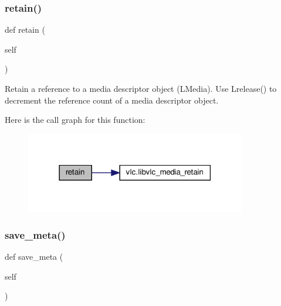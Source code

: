 \subsubsection{\texorpdfstring{retain()}{retain()}}
{\footnotesize\ttfamily def retain (\begin{DoxyParamCaption}\item[{}]{self }\end{DoxyParamCaption})}

\begin{DoxyVerb}Retain a reference to a media descriptor object (L{Media}). Use
L{release}() to decrement the reference count of a
media descriptor object.
\end{DoxyVerb}
 Here is the call graph for this function\+:
\nopagebreak
\begin{figure}[H]
\begin{center}
\leavevmode
\includegraphics[width=273pt]{classvlc_1_1_media_a6394d82a0b79f0f91bb059d20ab43490_cgraph}
\end{center}
\end{figure}
\mbox{\label{classvlc_1_1_media_a24cb83ba2ba5d7060ba6541c5401b175}} 
\subsubsection{\texorpdfstring{save\+\_\+meta()}{save\_meta()}}
{\footnotesize\ttfamily def save\+\_\+meta (\begin{DoxyParamCaption}\item[{}]{self }\end{DoxyParamCaption})}

